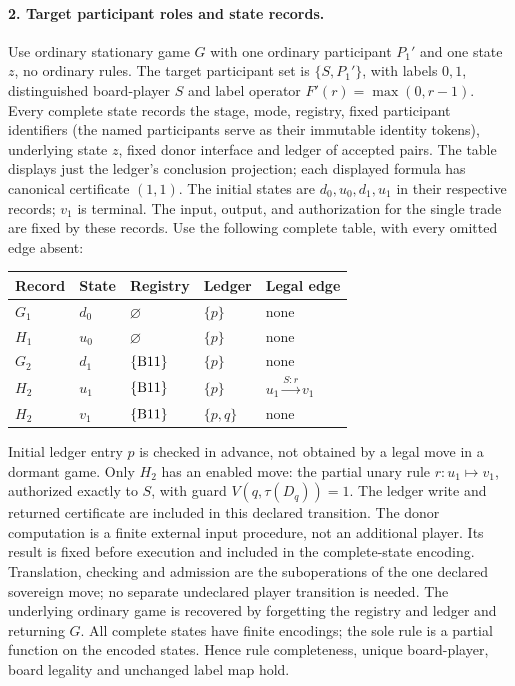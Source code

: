 \documentclass[11pt]{article}
\theoremstyle{definition}\newtheorem{definition}[theorem]{Definition}
\begin{document}
\paragraph{2. Target participant roles and state records.} Use ordinary stationary game $G$ with one ordinary participant $P_1'$ and one state $z$, no ordinary rules. The target participant set is $\{S,P_1'\}$, with labels $0,1$, distinguished board-player $S$ and label operator $F'(r)=\max(0,r-1)$. Every complete state records the stage, mode, registry, fixed participant identifiers (the named participants serve as their immutable identity tokens), underlying state $z$, fixed donor interface and ledger of accepted pairs. The table displays just the ledger's conclusion projection; each displayed formula has canonical certificate $(1,1)$. The initial states are $d_0,u_0,d_1,u_1$ in their respective records; $v_1$ is terminal. The input, output, and authorization for the single trade are fixed by these records. Use the following complete table, with every omitted edge absent:
\begin{center}\small
\begin{tabular}{@{}lllll@{}}
\toprule Record & State & Registry & Ledger & Legal edge\\\midrule
$G_1$ & $d_0$ & $\varnothing$ & $\{p\}$ & none\\
$H_1$ & $u_0$ & $\varnothing$ & $\{p\}$ & none\\
$G_2$ & $d_1$ & $\{\mathrm{B11}\}$ & $\{p\}$ & none\\
$H_2$ & $u_1$ & $\{\mathrm{B11}\}$ & $\{p\}$ & $u_1\xrightarrow{S:r}v_1$\\
$H_2$ & $v_1$ & $\{\mathrm{B11}\}$ & $\{p,q\}$ & none\\\bottomrule
\end{tabular}\end{center}
Initial ledger entry $p$ is checked in advance, not obtained by a legal move in a dormant game. Only $H_2$ has an enabled move: the partial unary rule $r:u_1\mapsto v_1$, authorized exactly to $S$, with guard $V(q,\tau(D_q))=1$. The ledger write and returned certificate are included in this declared transition. The donor computation is a finite external input procedure, not an additional player. Its result is fixed before execution and included in the complete-state encoding. Translation, checking and admission are the suboperations of the one declared sovereign move; no separate undeclared player transition is needed. The underlying ordinary game is recovered by forgetting the registry and ledger and returning $G$. All complete states have finite encodings; the sole rule is a partial function on the encoded states. Hence rule completeness, unique board-player, board legality and unchanged label map hold.
\end{document}
